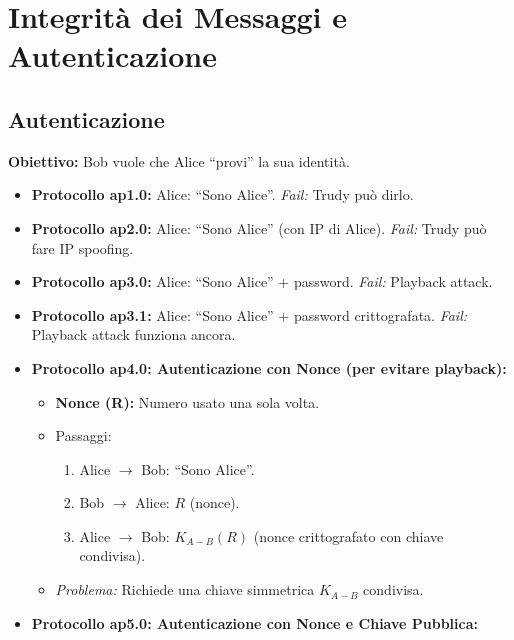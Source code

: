 \section{Integrità dei Messaggi e Autenticazione}
\label{sec:integrita_autenticazione}

\subsection{Autenticazione}
\textbf{Obiettivo:} Bob vuole che Alice \textquotedblleft provi\textquotedblright{} la sua identità.

\begin{itemize}
    \item \textbf{Protocollo ap1.0:} Alice: \textquotedblleft Sono Alice\textquotedblright{}. \textit{Fail:} Trudy può dirlo.
    \item \textbf{Protocollo ap2.0:} Alice: \textquotedblleft Sono Alice\textquotedblright{} (con IP di Alice). \textit{Fail:} Trudy può fare IP spoofing.
    \item \textbf{Protocollo ap3.0:} Alice: \textquotedblleft Sono Alice\textquotedblright{} + password. \textit{Fail:} Playback attack.
    \item \textbf{Protocollo ap3.1:} Alice: \textquotedblleft Sono Alice\textquotedblright{} + password crittografata. \textit{Fail:} Playback attack funziona ancora.
    \item \textbf{Protocollo ap4.0: Autenticazione con Nonce (per evitare playback):}
    \begin{itemize}
        \item \textbf{Nonce (R):} Numero usato una sola volta.
        \item Passaggi:
        \begin{enumerate}
            \item Alice $\rightarrow$ Bob: \textquotedblleft Sono Alice\textquotedblright{}.
            \item Bob $\rightarrow$ Alice: $R$ (nonce).
            \item Alice $\rightarrow$ Bob: $K_{A-B}(R)$ (nonce crittografato con chiave condivisa).
        \end{enumerate}
        \item \textit{Problema:} Richiede una chiave simmetrica $K_{A-B}$ condivisa.
    \end{itemize}
    \item \textbf{Protocollo ap5.0: Autenticazione con Nonce e Chiave Pubblica:}
    \begin{enumerate}

\end{enumerate}
\end{itemize}
